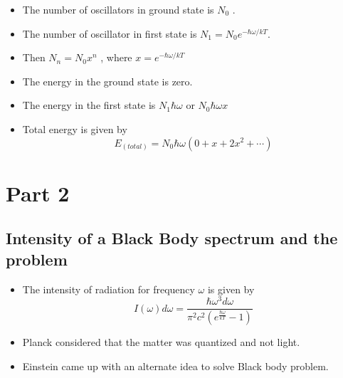 \documentclass[aspectratio=169]{beamer}
\begin{document}
\begin{frame}

	\begin{itemize}
		\item The number of oscillators in ground state is $ N_0 $ . \newline
		\item The number of oscillator in first state is $ N_1 = N_0  e^{-\hbar \omega / {kT}} . $ \vspace{0.5cm}
		\item Then $ N_n = N_0 x^n $ , where $ x = e^{-\hbar \omega / {kT}} $
	\end{itemize}
\end{frame}

\begin{frame}
	\begin{itemize}
	\item The energy in the ground state is zero. \newline
	\item The energy in the first state is $ N_1 \hbar \omega $ or $ N_0 \hbar \omega x $ \newline
	\item Total energy is given by \[ E_ \left(total \right) = N_0 \hbar \omega ( 0 + x + 2 x^2 + \cdots ) \] 
	\end{itemize}
\end{frame}
\section{Part 2}

\subsection{Intensity of a Black Body spectrum and the problem}

\begin{frame}{}

	\begin{itemize}

		\item The intensity of radiation for frequency $\omega$ is given by \[I(\omega)d\omega = \frac{\hbar \omega^3 d\omega}{ \pi^2 c^2 \left(e^{\frac{\hbar \omega}{kT}}-1 \right) } \] \newline
		\item Planck considered that the matter was quantized and not light. \newline
		\item Einstein came up with an alternate idea to solve Black body problem.
		 
	\end{itemize}
	
\end{frame}
\end{document}
